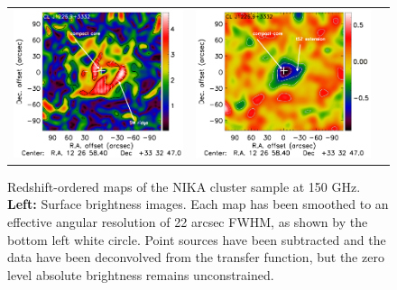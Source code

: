\documentclass[traditabstract]{aa}
\begin{document}
\begin{figure}[p]
{\begin{tabular}{lll}
\includegraphics[trim=2.3cm 0.7cm 0cm 0cm, clip=true, scale=1]{Figure/Grad_CLJ1227_15_15_45.pdf} & 
\includegraphics[trim=2.3cm 0.7cm 0cm 0cm, clip=true, scale=1]{Figure/DoG_CLJ1227_15_15_45.pdf}
\end{tabular}}
\caption{\footnotesize{Redshift-ordered maps of the NIKA cluster sample at 150 GHz. 
{\bf Left:} Surface brightness images. Each map has been smoothed to an effective angular resolution of 22 arcsec FWHM, as shown by the bottom left white circle. Point sources have been subtracted and the data have been deconvolved from the transfer function, but the zero level absolute brightness remains unconstrained. 
}}
\end{figure}
\end{document}

